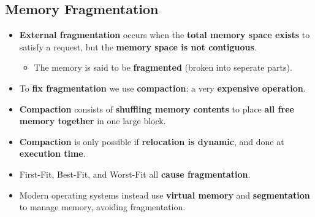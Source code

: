 \documentclass{article}
\begin{document}
    \subsection*{Memory Fragmentation}
    \begin{itemize}
        \item \textbf{External fragmentation} occurs when the \textbf{total memory space exists} to satisfy a request, but the \textbf{memory space is not contiguous}.
        \begin{itemize}
            \item The memory is said to be \textbf{fragmented} (broken into seperate parts).
        \end{itemize}
        \item To \textbf{fix fragmentation} we use \textbf{compaction}; a very \textbf{expensive operation}.
        \item \textbf{Compaction} consists of \textbf{shuffling memory contents} to place \textbf{all free memory together} in one large block.
        \item \textbf{Compaction} is only possible if \textbf{relocation is dynamic}, and done at \textbf{execution time}.
        \item First-Fit, Best-Fit, and Worst-Fit all \textbf{cause fragmentation}.
        \item Modern operating systems instead use \textbf{virtual memory} and \textbf{segmentation} to manage memory, avoiding fragmentation.
    \end{itemize}
\end{document}
